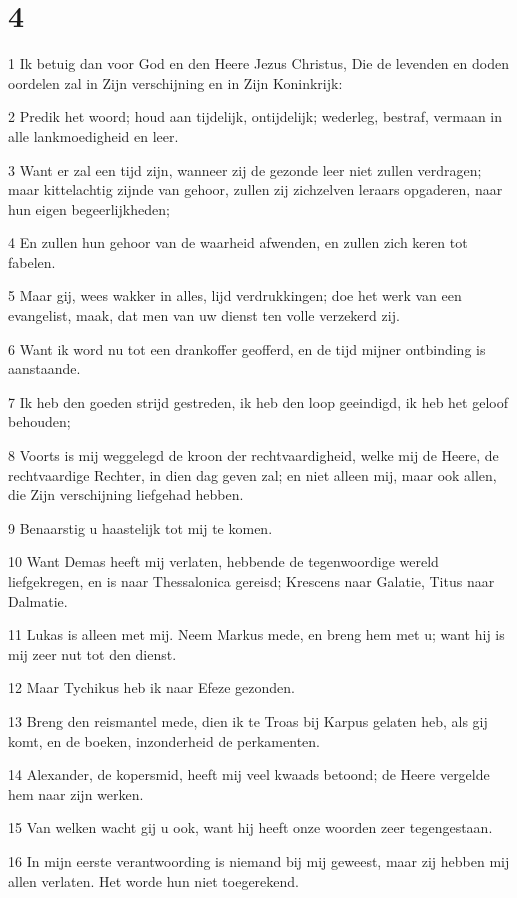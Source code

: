 \chapter{4}

\par 1 Ik betuig dan voor God en den Heere Jezus Christus, Die de levenden en doden oordelen zal in Zijn verschijning en in Zijn Koninkrijk:
\par 2 Predik het woord; houd aan tijdelijk, ontijdelijk; wederleg, bestraf, vermaan in alle lankmoedigheid en leer.
\par 3 Want er zal een tijd zijn, wanneer zij de gezonde leer niet zullen verdragen; maar kittelachtig zijnde van gehoor, zullen zij zichzelven leraars opgaderen, naar hun eigen begeerlijkheden;
\par 4 En zullen hun gehoor van de waarheid afwenden, en zullen zich keren tot fabelen.
\par 5 Maar gij, wees wakker in alles, lijd verdrukkingen; doe het werk van een evangelist, maak, dat men van uw dienst ten volle verzekerd zij.
\par 6 Want ik word nu tot een drankoffer geofferd, en de tijd mijner ontbinding is aanstaande.
\par 7 Ik heb den goeden strijd gestreden, ik heb den loop geeindigd, ik heb het geloof behouden;
\par 8 Voorts is mij weggelegd de kroon der rechtvaardigheid, welke mij de Heere, de rechtvaardige Rechter, in dien dag geven zal; en niet alleen mij, maar ook allen, die Zijn verschijning liefgehad hebben.
\par 9 Benaarstig u haastelijk tot mij te komen.
\par 10 Want Demas heeft mij verlaten, hebbende de tegenwoordige wereld liefgekregen, en is naar Thessalonica gereisd; Krescens naar Galatie, Titus naar Dalmatie.
\par 11 Lukas is alleen met mij. Neem Markus mede, en breng hem met u; want hij is mij zeer nut tot den dienst.
\par 12 Maar Tychikus heb ik naar Efeze gezonden.
\par 13 Breng den reismantel mede, dien ik te Troas bij Karpus gelaten heb, als gij komt, en de boeken, inzonderheid de perkamenten.
\par 14 Alexander, de kopersmid, heeft mij veel kwaads betoond; de Heere vergelde hem naar zijn werken.
\par 15 Van welken wacht gij u ook, want hij heeft onze woorden zeer tegengestaan.
\par 16 In mijn eerste verantwoording is niemand bij mij geweest, maar zij hebben mij allen verlaten. Het worde hun niet toegerekend.

